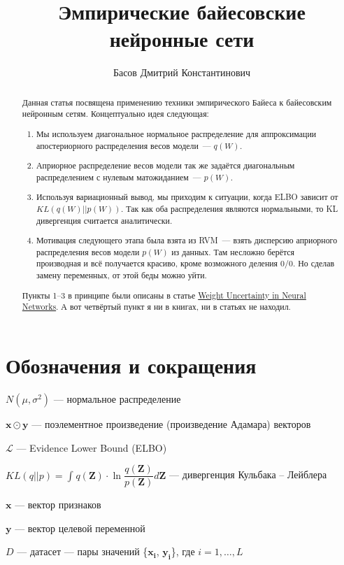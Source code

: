 \documentclass{article}
\title{Эмпирические байесовские нейронные сети}
\author{Басов Дмитрий Константинович}
\date{}
\begin{document}
\maketitle

\begin{abstract}

Данная статья посвящена применению техники эмпирического Байеса к байесовским нейронным сетям. Концептуально идея следующая:
\begin{enumerate}
 \item Мы используем диагональное нормальное распределение для аппроксимации апостериорного распределения весов модели~--- $q(W)$.
 \item Априорное распределение весов модели так же задаётся диагональным распределением с нулевым матожиданием~--- $p(W)$.
 \item Используя вариационный вывод, мы приходим к ситуации, когда ELBO зависит от $KL(q(W) || p(W))$. Так как оба распределения являются нормальными, то KL дивергенция считается аналитически.
 \item Мотивация следующего этапа была взята из RVM~--- взять дисперсию априорного распределения весов модели $p(W)$ из данных. Там несложно берётся производная и всё получается красиво, кроме возможного деления 0/0. Но сделав замену переменных, от этой беды можно уйти.
\end{enumerate}
Пункты 1--3 в принципе были описаны в статье \href{https://arxiv.org/pdf/1505.05424}{Weight Uncertainty in Neural Networks}. А вот четвёртый пункт я ни в книгах, ни в статьях не находил.

\end{abstract}


\section{Обозначения и сокращения}
$N(\mu, \sigma^2)$ --- нормальное распределение

$\mathbf{x} \odot \mathbf{y}$ --- поэлементное произведение (произведение Адамара) векторов

$\mathcal{L}$ --- Evidence Lower Bound (ELBO)

$KL(q || p) = \int_{}{} q(\mathbf{Z}) \cdot \ln{\dfrac{q(\mathbf{Z})}{p(\mathbf{Z})}} d\mathbf{Z}$ --- дивергенция Кульбака -- Лейблера

$\mathbf{x}$ --- вектор признаков

$\mathbf{y}$ --- вектор целевой переменной

$D$ --- датасет --- пары значений \{$\mathbf{x_i}$, $\mathbf{y_i}$\}, где $i = 1, \dots, L$
\end{document}
